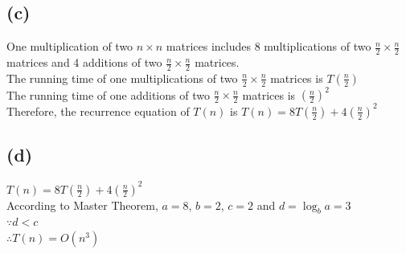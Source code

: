 \documentclass{article} %
\begin{document}
\subsection*{(c)}
One multiplication of two $n \times n$ matrices includes 8 multiplications of two $\frac{n}{2} \times \frac{n}{2}$ matrices 
and 4 additions of two $\frac{n}{2} \times \frac{n}{2}$ matrices.\\
The running time of one multiplications of two $\frac{n}{2} \times \frac{n}{2}$ matrices is $T(\frac{n}{2})$\\
The running time of one additions of two $\frac{n}{2} \times \frac{n}{2}$ matrices is $(\frac{n}{2})^2$\\
Therefore, the recurrence equation of $T(n)$ is $T(n) = 8T(\frac{n}{2}) +4(\frac{n}{2})^2$

\subsection*{(d)}
$T(n) = 8T(\frac{n}{2}) +4(\frac{n}{2})^2$\\
According to Master Theorem, $a=8$, $b=2$, $c=2$ and $d=\log_{b}{a}=3$\\
$\because d<c$\\
$\therefore T(n)=O(n^3)$\\
\end{document}
